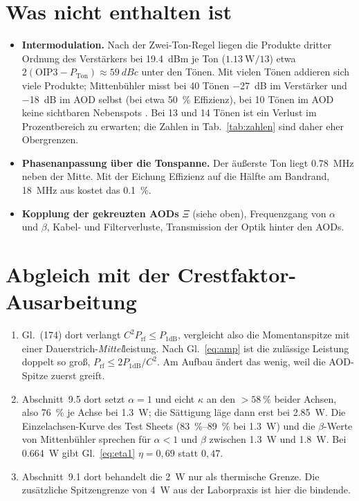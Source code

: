 \documentclass[11pt,a4paper]{article}
\newcommand{\Pone}{P_{\mathrm{1dB}}}
\newcommand{\Prf}{P_{\mathrm{rf}}}
\begin{document}
\section{Was nicht enthalten ist}

\begin{itemize}
\item \textbf{Intermodulation.} Nach der Zwei-Ton-Regel liegen die Produkte
  dritter Ordnung des Verstärkers bei \SI{19,4}{dBm} je Ton
  ($\SI{1,13}{\watt}/13$) etwa $2(\mathrm{OIP3}-P_\mathrm{Ton})\approx
  \SI{59}{dBc}$ unter den Tönen. Mit vielen Tönen addieren sich viele Produkte;
  Mittenbühler misst bei 40 Tönen \SI{-27}{\deci\bel} im Verstärker und
  \SI{-18}{\deci\bel} im AOD selbst (bei etwa \SI{50}{\percent} Effizienz), bei
  10 Tönen im AOD keine sichtbaren Nebenspots \cite[Abschn.~2.3, 3.3.4]{mittenbuehler}.
  Bei 13 und 14 Tönen ist ein Verlust im Prozentbereich zu erwarten; die Zahlen
  in Tab.~\ref{tab:zahlen} sind daher eher Obergrenzen.
\item \textbf{Phasenanpassung über die Tonspanne.} Der äußerste Ton liegt
  \SI{0,78}{\mega\hertz} neben der Mitte. Mit der Eichung \glqq Effizienz auf die
  Hälfte am Bandrand, \SI{18}{\mega\hertz}\grqq{} aus \cite[Gl.~202--203]{crest}
  kostet das \SI{0,1}{\percent}.
\item \textbf{Kopplung der gekreuzten AODs} $\Xi$ (siehe oben), Frequenzgang von
  $\alpha$ und $\beta$, Kabel- und Filterverluste, Transmission der Optik hinter
  den AODs.
\end{itemize}

\section{Abgleich mit der Crestfaktor-Ausarbeitung}

\begin{enumerate}
\item Gl.~(174) dort verlangt $C^2\Prf\le\Pone$, vergleicht also die
  Momentanspitze mit einer Dauerstrich-\emph{Mittel}\-leistung. Nach
  Gl.~\eqref{eq:amp} ist die zulässige Leistung doppelt so groß,
  $\Prf\le2\Pone/C^2$. Am Aufbau ändert das wenig, weil die AOD-Spitze zuerst
  greift.
\item Abschnitt~9.5 dort setzt $\alpha=1$ und eicht $\kappa$ an den \glqq$>\SI{58}{\percent}$\grqq{}
  beider Achsen, also \SI{76}{\percent} je Achse bei \SI{1,3}{\watt}; die
  Sättigung läge dann erst bei \SI{2,85}{\watt}. Die Einzelachsen-Kurve des Test
  Sheets (\SIrange{83}{89}{\percent} bei \SI{1,3}{\watt}) und die $\beta$-Werte
  von Mittenbühler sprechen für $\alpha<1$ und $\beta$ zwischen \SI{1,3}{\watt}
  und \SI{1,8}{\watt}. Bei \SI{0,664}{\watt} gibt Gl.~\eqref{eq:eta1}
  $\eta=0{,}69$ statt $0{,}47$.
\item Abschnitt~9.1 dort behandelt die \SI{2}{\watt} nur als thermische Grenze.
  Die zusätzliche Spitzengrenze von \SI{4}{\watt} aus der Laborpraxis ist hier
  die bindende.
\end{enumerate}
\end{document}
